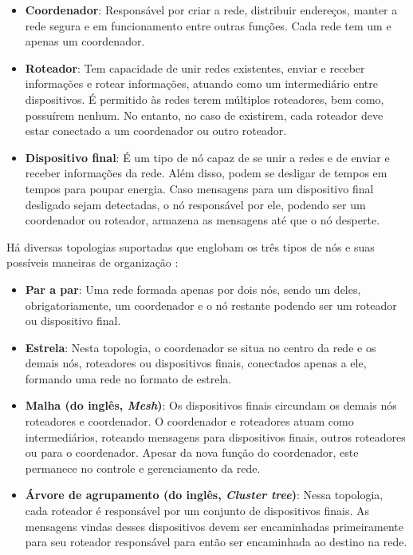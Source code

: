 \begin{itemize}[noitemsep,topsep=5pt]
	\item \textbf{Coordenador}: Responsável por criar a rede, distribuir endereços, manter a rede segura e em funcionamento entre outras funções. Cada rede tem um e apenas um coordenador.
	\item \textbf{Roteador}: Tem capacidade de unir redes existentes, enviar e receber informações e rotear 	informações, atuando como um intermediário entre dispositivos. É permitido às redes terem múltiplos roteadores, bem como, possuírem nenhum. No entanto, no caso de existirem, cada roteador deve estar conectado a um coordenador ou outro roteador.
	\item \textbf{Dispositivo final}: É um tipo de nó capaz de se unir a redes e de enviar e receber informações da rede. Além disso, podem se desligar de tempos em tempos para poupar energia. Caso mensagens para um dispositivo final desligado sejam detectadas, o nó responsável por ele, podendo ser um coordenador ou roteador, armazena as mensagens até que o nó desperte.
\end{itemize}

Há diversas topologias suportadas que englobam os três tipos de nós e suas possíveis 
maneiras de organização \cite{Faludi2011}:

\begin{itemize}[noitemsep,topsep=5pt]
	\item \textbf{Par a par}: Uma rede formada apenas por dois nós, sendo um deles, obrigatoriamente, um 
	coordenador e o nó restante podendo ser um roteador ou dispositivo final.
	\item \textbf{Estrela}: Nesta topologia, o coordenador se situa no centro da rede e os demais nós, 
	roteadores ou dispositivos finais, conectados apenas a ele, formando uma rede no formato de 
	estrela.
	\item \textbf{Malha (do inglês, \textit{Mesh})}: Os dispositivos finais circundam os demais nós roteadores e coordenador. O coordenador e roteadores atuam como intermediários, roteando mensagens para dispositivos finais, outros roteadores ou para o coordenador. Apesar da nova função do coordenador, este permanece no controle e gerenciamento da rede.
	\item \textbf{Árvore de agrupamento (do inglês, \textit{Cluster tree})}: Nessa topologia, cada roteador é responsável por um conjunto de dispositivos finais. As mensagens vindas desses dispositivos devem ser encaminhadas primeiramente para seu roteador responsável para então ser encaminhada ao destino na rede.
\end{itemize}

